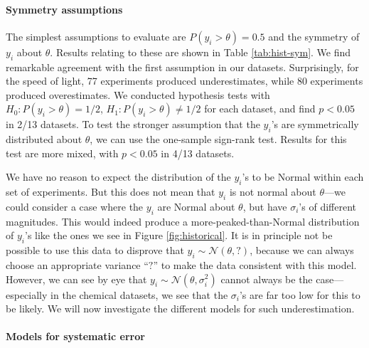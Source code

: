 \documentclass[12pt]{article}
\begin{document}
\paragraph{Symmetry assumptions} The simplest assumptions to evaluate are $P(y_i>\theta)=0.5$ and the symmetry of $y_i$ about $\theta$. Results relating to these are shown in Table \ref{tab:hist-sym}. We find remarkable agreement with the first assumption in our datasets. Surprisingly, for the speed of light, 77 experiments produced underestimates, while 80 experiments produced overestimates. We conducted hypothesis tests with $H_0: P(y_i>\theta)=1/2$, $H_1: P(y_i>\theta)\neq 1/2$ for each dataset, and find $p<0.05$ in 2/13 datasets. To test the stronger assumption that the $y_i$'s are symmetrically distributed about $\theta$, we can use the one-sample sign-rank test. Results for this test are more mixed, with $p<0.05$ in 4/13 datasets.

We have no reason to expect the distribution of the $y_i$'s to be Normal within each set of experiments. But this does not mean that $y_i$ is not normal about $\theta$---we could consider a case where the $y_i$ are Normal about $\theta$, but have $\sigma_i$'s of different magnitudes. This would indeed produce a more-peaked-than-Normal distribution of $y_i$'s like the ones we see in Figure \ref{fig:historical}. It is in principle not be possible to use this data to disprove that $y_i\sim\mathcal{N}(\theta,?)$, because we can always choose an appropriate variance ``$?$'' to make the data consistent with this model. However, we can see by eye that $y_i\sim\mathcal{N}(\theta,\sigma_i^2)$ cannot always be the case---especially in the chemical datasets, we see that the $\sigma_i$'s are far too low for this to be likely. We will now investigate the different models for such underestimation.

\paragraph{Models for systematic error} 
\end{document}
